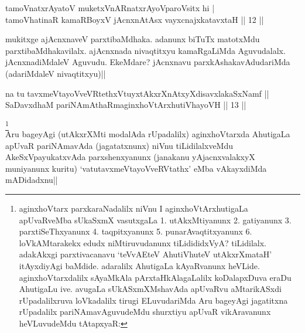 
\begin{shl}
tamoVnatxrAyatoV muketxVnARnatxrAyoV\s paroV\s sitx hi | \\
tamoVhatinaR kamaRBoyxV jAcnxnAtAsx vayxcnajxkatavxtaH \hfill|| 12 || 
\end{shl}

\begin{artha}
mukitxge ajAcnxnaveV parxtibaMdhaka. adanunx biTuTx matotxMdu 
parxtibaMdhakavilalx. ajAcnxnada nivaqtitxyu kamaRgaLiMda Aguvudalalx. 
jAcnxnadiMdaleV Aguvudu. EkeMdare? jAcnxnavu parxkAshakavAdudariMda 
(adariMdaleV nivaqtitxyu)||
\end{artha}


\begin{shl}
na tu tavxmeVtayoVveVRtethxVtuyxtAkxrXnAtxyXdisavxlakaSxNamf || \\
SaDavxdhaM pariNAmAthaRmaginxhoVtArxhutiVhayoVH \hfill|| 13 || 
\end{shl}

\begin{artha}
\footnote[1]{aginxhoVtarx parxkaraNadalilx niVnu I 
aginxhoVtArxhutigaLa apUvaRveMba sUkaSxmX vasutxgaLa 1. utAkxMtiyanunx 
2. gatiyanunx 3. parxtiSeThxyanunx 4. taqpitxyanunx 5. 
punarAvaqtitxyanunx 6. loVkAMtarakekx edudx niMtiruvudanunx 
tiLidididxVyA? tiLidilalx. adakAkxgi parxtivacanavu `teVvAEteV 
AhutiVhuteV utAkxrXmataH' itAyxdiyAgi baMdide. adaralilx AhutigaLa 
kAyaRvanunx heVLide. aginxhoVtarxdalilx sAyaMkAla pArxtaHkAlagaLalilx 
koDalapxDuva eraDu AhutigaLu ive. avugaLa sUkASxmXMshavAda apUvaRvu 
aMtarikASxdi rUpadalilxruva loVkadalilx tirugi ELuvudariMda Aru 
bageyAgi jagatitxna rUpadalilx pariNAmavAguvudeMdu shurxtiyu apUvaR 
vikAravanunx heVLuvudeMdu tAtapxyaR:}\\
Aru bageyAgi (utAkxrXMti modalAda rUpadalilx) aginxhoVtarxda AhutigaLa 
apUvaR pariNAmavAda (jagatatxnunx) niVnu tiLidilalxveMdu 
AkeSxVpayukatxvAda parxshenxyanunx (janakanu yAjacnxvalakxyX 
muniyanunx kuritu) `vatutavxmeVtayoVveRVtathx' eMba vAkayxdiMda 
mADidadxnu||
\end{artha}

